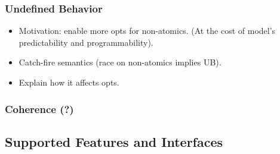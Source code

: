 \subsubsection{Undefined Behavior}
\label{sec:background:ub}

\begin{itemize}
  \item Motivation: enable more opts for non-atomics.
        (At the cost of model's predictability and programmability).
  \item Catch-fire semantics (race on non-atomics implies UB).
  \item Explain how it affects opts.
\end{itemize}

\subsubsection{Coherence (?)}
\label{sec:background:coh}

\subsection{Supported Features and Interfaces}

